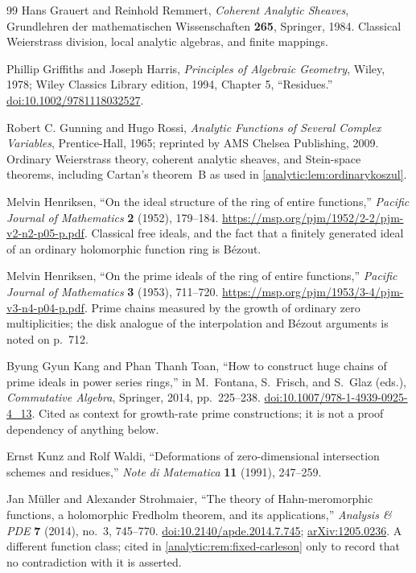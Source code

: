 \documentclass[11pt,letterpaper]{article}
\theoremstyle{definition}
\theoremstyle{remark}
\numberwithin{equation}{section}
\begin{document}
\begin{thebibliography}{99}
Hans Grauert and Reinhold Remmert,
\emph{Coherent Analytic Sheaves},
Grundlehren der mathematischen Wissenschaften \textbf{265}, Springer, 1984.
Classical Weierstrass division, local analytic algebras, and finite
mappings.

Phillip Griffiths and Joseph Harris,
\emph{Principles of Algebraic Geometry}, Wiley, 1978; Wiley Classics Library
edition, 1994, Chapter 5, ``Residues.''
\href{https://doi.org/10.1002/9781118032527}{doi:10.1002/9781118032527}.

Robert C. Gunning and Hugo Rossi,
\emph{Analytic Functions of Several Complex Variables},
Prentice-Hall, 1965; reprinted by AMS Chelsea Publishing, 2009.
Ordinary Weierstrass theory, coherent analytic sheaves, and Stein-space
theorems, including Cartan's theorem~B as used in
\cref{analytic:lem:ordinarykoszul}.

Melvin Henriksen,
``On the ideal structure of the ring of entire functions,''
\emph{Pacific Journal of Mathematics} \textbf{2} (1952), 179--184.
\url{https://msp.org/pjm/1952/2-2/pjm-v2-n2-p05-p.pdf}.
Classical free ideals, and the fact that a finitely generated ideal of an
ordinary holomorphic function ring is B\'ezout.

Melvin Henriksen,
``On the prime ideals of the ring of entire functions,''
\emph{Pacific Journal of Mathematics} \textbf{3} (1953), 711--720.
\url{https://msp.org/pjm/1953/3-4/pjm-v3-n4-p04-p.pdf}.
Prime chains measured by the growth of ordinary zero multiplicities; the
disk analogue of the interpolation and B\'ezout arguments is noted on
p.~712.

Byung Gyun Kang and Phan Thanh Toan,
``How to construct huge chains of prime ideals in power series rings,'' in
M.~Fontana, S.~Frisch, and S.~Glaz (eds.), \emph{Commutative Algebra},
Springer, 2014, pp.~225--238.
\href{https://doi.org/10.1007/978-1-4939-0925-4_13}{doi:10.1007/978-1-4939-0925-4\_13}.
Cited as context for growth-rate prime constructions; it is not a proof
dependency of anything below.

Ernst Kunz and Rolf Waldi,
``Deformations of zero-dimensional intersection schemes and residues,''
\emph{Note di Matematica} \textbf{11} (1991), 247--259.

Jan M\"uller and Alexander Strohmaier,
``The theory of Hahn-meromorphic functions, a holomorphic Fredholm theorem,
and its applications,''
\emph{Analysis \& PDE} \textbf{7} (2014), no.~3, 745--770.
\href{https://doi.org/10.2140/apde.2014.7.745}{doi:10.2140/apde.2014.7.745};
\href{https://arxiv.org/abs/1205.0236}{arXiv:1205.0236}.
A different function class; cited in \cref{analytic:rem:fixed-carleson}
only to record that no contradiction with it is asserted.


\end{thebibliography}
\end{document}
